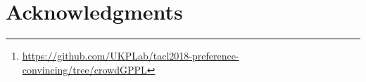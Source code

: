 \documentclass[smallcondensed,natbib]{svjour3}     %
\begin{document}
\begin{abstract}
We make our software publicly available for future 
work~\footnote{\url{https://github.com/UKPLab/tacl2018-preference-convincing/tree/crowdGPPL}}.
\end{abstract}

%






%




\section*{Acknowledgments}




\appendix


\end{document}
